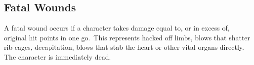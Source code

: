 

\subsection{Fatal Wounds}
A fatal wound occurs if a character takes damage equal to, or in excess of, original hit points in one go. This represents hacked off limbs, blows that shatter rib cages, decapitation, blows that stab the heart or other vital organs directly. The character is immediately dead. 

